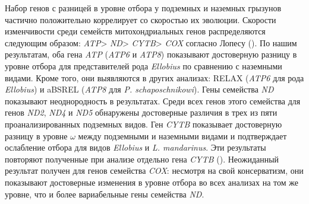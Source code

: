 Набор генов с разницей в уровне отбора у подземных и наземных грызунов частично положительно коррелирует со скоростью их эволюции. Скорости изменчивости среди семейств митохондриальных генов распределяются следующим образом: \textit{ATP}> \textit{ND}> \textit{CYTB}> \textit{COX} согласно Лопесу (\cite{Lopez1997}). По нашим результатам, оба гена \textit{ATP} (\textit{ATP6} и \textit{ATP8}) показывают достоверную разницу в уровне отбора для представителей рода \textit{Ellobius} по сравнению с наземными видами. Кроме того, они выявляются в других анализах: RELAX (\textit{ATP6} для рода \textit{Ellobius}) и aBSREL (\textit{ATP8} для \textit{P. schaposchnikowi}). Гены семейства \textit{ND} показывают неоднородность в результатах. Среди всех генов этого семейства для генов \textit{ND2}, \textit{ND4} и \textit{ND5} обнаружены достоверные различия в трех из пяти проанализированных подземных видов. Ген \textit{CYTB} показывает достоверную разницу в уровне $\omega$ между подземными и наземными видами и подтверждает ослабление отбора для видов \textit{Ellobius} и \textit{L. mandarinus}. Эти результаты повторяют полученные при анализе отдельно гена \textit{CYTB} (\cite{Bondareva2021}). Неожиданный результат получен для генов семейства \textit{COX}: несмотря на свой консерватизм, они показывают достоверные изменения в уровне отбора во всех анализах на том же уровне, что и более вариабельные гены семейства \textit{ND}.


